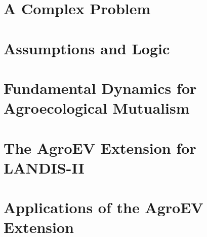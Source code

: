\documentclass[reqno,12pt,oneside]{report}  %
\begin{document}

%



\startthechapters 
 
  
\chapter{A Complex Problem}
 
  \label{chap:Intro}

  
\chapter{Assumptions and Logic}
 
  \label{chap:Intro}  


\chapter{Fundamental Dynamics for Agroecological Mutualism}
 
  \label{chap:Dynamics}


\chapter{The AgroEV Extension for LANDIS-II}
 
 \label{chap:AgroEV}
 
 
\chapter{Applications of the AgroEV Extension}
 
 \label{chap:Apps}

 
 
\startappendices
  
  \label{app:defs}
 
 
  
 \startbibliography
 \begin{singlespace} %
  
  
 \end{singlespace}
\end{document}
